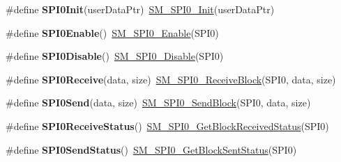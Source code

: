 \begin{DoxyCompactItemize}
\item 
\hypertarget{group___func_ala_ga0d702fdd60a2c4d2b9d98a3c243ec90b}{\#define {\bfseries S\-P\-I0\-Init}(user\-Data\-Ptr)~\hyperlink{group___s_m___s_p_i0__module_ga9695223438dc87b3bd2e720cadf1a40e}{S\-M\-\_\-\-S\-P\-I0\-\_\-\-Init}(user\-Data\-Ptr)}\label{group___func_ala_ga0d702fdd60a2c4d2b9d98a3c243ec90b}

\item 
\hypertarget{group___func_ala_ga8cf9d13f1ddf8d437da37b3b6cd51d92}{\#define {\bfseries S\-P\-I0\-Enable}()~\hyperlink{group___s_m___s_p_i0__module_ga7a0101661c362b85b8ff6d399ccce8e1}{S\-M\-\_\-\-S\-P\-I0\-\_\-\-Enable}(S\-P\-I0)}\label{group___func_ala_ga8cf9d13f1ddf8d437da37b3b6cd51d92}

\item 
\hypertarget{group___func_ala_ga619cf1ee096b29975feb750960c6f5ad}{\#define {\bfseries S\-P\-I0\-Disable}()~\hyperlink{group___s_m___s_p_i0__module_ga38cb2d4bd7ed0210fbd9d98a684de4a4}{S\-M\-\_\-\-S\-P\-I0\-\_\-\-Disable}(S\-P\-I0)}\label{group___func_ala_ga619cf1ee096b29975feb750960c6f5ad}

\item 
\hypertarget{group___func_ala_ga3bfb07539fee2823d8527b0ab17d6fa6}{\#define {\bfseries S\-P\-I0\-Receive}(data, size)~\hyperlink{group___s_m___s_p_i0__module_gaa40f4d13fea51ef3bbe1ce1168a7bdc8}{S\-M\-\_\-\-S\-P\-I0\-\_\-\-Receive\-Block}(S\-P\-I0, data, size)}\label{group___func_ala_ga3bfb07539fee2823d8527b0ab17d6fa6}

\item 
\hypertarget{group___func_ala_ga3ba4b7f4b6dc9c8582b628aa00f56067}{\#define {\bfseries S\-P\-I0\-Send}(data, size)~\hyperlink{group___s_m___s_p_i0__module_ga9b87283c09356cd586673974287aa05b}{S\-M\-\_\-\-S\-P\-I0\-\_\-\-Send\-Block}(S\-P\-I0, data, size)}\label{group___func_ala_ga3ba4b7f4b6dc9c8582b628aa00f56067}

\item 
\hypertarget{group___func_ala_gaddc4ea546c347a75685e323b495abe12}{\#define {\bfseries S\-P\-I0\-Receive\-Status}()~\hyperlink{group___s_m___s_p_i0__module_ga5a3ff4fcd27616aba262631313bafd97}{S\-M\-\_\-\-S\-P\-I0\-\_\-\-Get\-Block\-Received\-Status}(S\-P\-I0)}\label{group___func_ala_gaddc4ea546c347a75685e323b495abe12}

\item 
\hypertarget{group___func_ala_gabe3f36cf1ecb8c4f13cff512794b094d}{\#define {\bfseries S\-P\-I0\-Send\-Status}()~\hyperlink{group___s_m___s_p_i0__module_ga1a6a0245b47ffaa280d5286978cfb1c2}{S\-M\-\_\-\-S\-P\-I0\-\_\-\-Get\-Block\-Sent\-Status}(S\-P\-I0)}\label{group___func_ala_gabe3f36cf1ecb8c4f13cff512794b094d}


\end{DoxyCompactItemize}
